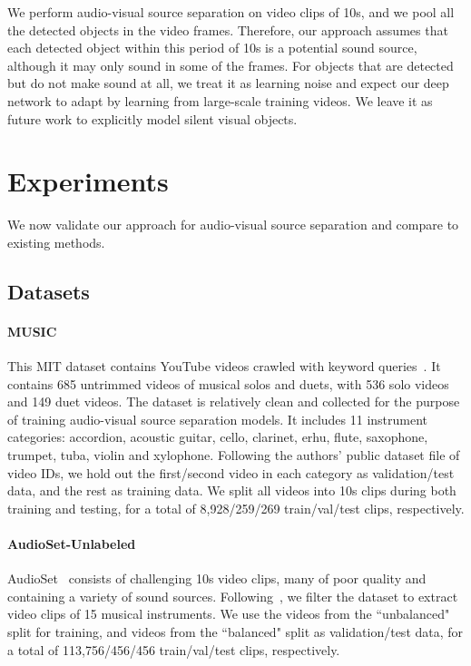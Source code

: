 \documentclass[10pt,twocolumn,letterpaper]{article}
\begin{document}
We perform audio-visual source separation on video clips of 10s, and we pool all the detected objects in the video frames. Therefore, our approach assumes that each detected object within this period of 10s is a potential sound source, although it may only sound in some of the frames. For objects that are detected but do not make sound at all, we treat it as learning noise and expect our deep network to adapt by learning from large-scale training videos. We leave it as future work to explicitly model silent visual objects.  \vspace*{-0.05in}
\section{Experiments}\label{sec:results}
\vspace*{-0.05in}
We now validate our approach for audio-visual source separation and compare to existing methods.

\subsection{Datasets}
\paragraph{MUSIC}
This MIT dataset contains YouTube videos crawled with keyword queries~\cite{zhao2018sound}. It contains 685 untrimmed videos of musical solos and duets, with 536 solo videos and 149 duet videos. The dataset is relatively clean and collected for the purpose of training audio-visual source separation models. It includes 11 instrument categories: accordion, acoustic guitar, cello, clarinet, erhu, flute, saxophone, trumpet, tuba, violin and xylophone. Following the authors' public dataset file of video IDs, we hold out the first/second video in each category as validation/test data, and the rest as training data. We split all videos into 10s clips during both training and testing, for a total of 8,928/259/269 train/val/test clips, respectively.
\vspace*{-0.15in}
\paragraph{AudioSet-Unlabeled}
AudioSet~\cite{gemmeke2017audio} consists of challenging 10s video clips, many of poor quality and containing a variety of sound sources. Following~\cite{gao2018objectSounds}, we filter the dataset to extract video clips of 15 musical instruments. We use the videos from the ``unbalanced" split for training, and videos from the ``balanced" split as validation/test data, for a total of 113,756/456/456 train/val/test clips, respectively.
\vspace*{-0.15in}
\end{document}
